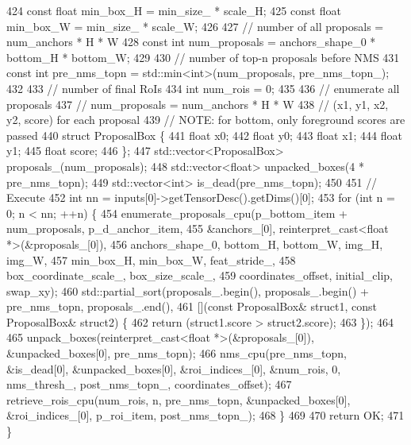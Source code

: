 \begin{DoxyCode}
424         \textcolor{keyword}{const} \textcolor{keywordtype}{float} min\_box\_H = min\_size\_ * scale\_H;
425         \textcolor{keyword}{const} \textcolor{keywordtype}{float} min\_box\_W = min\_size\_ * scale\_W;
426 
427         \textcolor{comment}{// number of all proposals = num\_anchors * H * W}
428         \textcolor{keyword}{const} \textcolor{keywordtype}{int} num\_proposals = anchors\_shape\_0 * bottom\_H * bottom\_W;
429 
430         \textcolor{comment}{// number of top-n proposals before NMS}
431         \textcolor{keyword}{const} \textcolor{keywordtype}{int} pre\_nms\_topn = std::min<int>(num\_proposals, pre\_nms\_topn\_);
432 
433         \textcolor{comment}{// number of final RoIs}
434         \textcolor{keywordtype}{int} num\_rois = 0;
435 
436         \textcolor{comment}{// enumerate all proposals}
437         \textcolor{comment}{//   num\_proposals = num\_anchors * H * W}
438         \textcolor{comment}{//   (x1, y1, x2, y2, score) for each proposal}
439         \textcolor{comment}{// NOTE: for bottom, only foreground scores are passed}
440         \textcolor{keyword}{struct }ProposalBox \{
441             \textcolor{keywordtype}{float} x0;
442             \textcolor{keywordtype}{float} y0;
443             \textcolor{keywordtype}{float} x1;
444             \textcolor{keywordtype}{float} y1;
445             \textcolor{keywordtype}{float} score;
446         \};
447         std::vector<ProposalBox> proposals\_(num\_proposals);
448         std::vector<float> unpacked\_boxes(4 * pre\_nms\_topn);
449         std::vector<int> is\_dead(pre\_nms\_topn);
450 
451         \textcolor{comment}{// Execute}
452         \textcolor{keywordtype}{int} nn = inputs[0]->getTensorDesc().getDims()[0];
453         \textcolor{keywordflow}{for} (\textcolor{keywordtype}{int} n = 0; n < nn; ++n) \{
454             enumerate\_proposals\_cpu(p\_bottom\_item + num\_proposals, p\_d\_anchor\_item,
455                                     &anchors\_[0], reinterpret\_cast<float *>(&proposals\_[0]),
456                                     anchors\_shape\_0, bottom\_H, bottom\_W, img\_H, img\_W,
457                                     min\_box\_H, min\_box\_W, feat\_stride\_,
458                                     box\_coordinate\_scale\_, box\_size\_scale\_,
459                                     coordinates\_offset, initial\_clip, swap\_xy);
460             std::partial\_sort(proposals\_.begin(), proposals\_.begin() + pre\_nms\_topn, proposals\_.end(),
461                               [](\textcolor{keyword}{const} ProposalBox& struct1, \textcolor{keyword}{const} ProposalBox& struct2) \{
462                                   \textcolor{keywordflow}{return} (struct1.score > struct2.score);
463                               \});
464 
465             unpack\_boxes(reinterpret\_cast<float *>(&proposals\_[0]), &unpacked\_boxes[0], pre\_nms\_topn);
466             nms\_cpu(pre\_nms\_topn, &is\_dead[0], &unpacked\_boxes[0], &roi\_indices\_[0], &num\_rois, 0, 
      nms\_thresh\_, post\_nms\_topn\_, coordinates\_offset);
467             retrieve\_rois\_cpu(num\_rois, n, pre\_nms\_topn, &unpacked\_boxes[0], &roi\_indices\_[0], p\_roi\_item, 
      post\_nms\_topn\_);
468         \}
469 
470         \textcolor{keywordflow}{return} OK;
471     \}
\end{DoxyCode}


